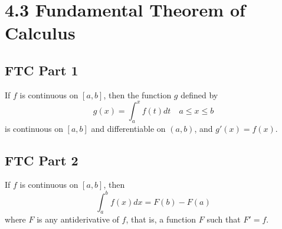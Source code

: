 %
%

\section*{4.3 Fundamental Theorem of Calculus}

\subsection*{FTC Part 1}

If \(f\) is continuous on \([a, b]\), then the function \(g\) defined by 
$$ g(x) = \int_a^x f(t)dt \quad a \leq x \leq b $$
is continuous on \([a, b]\) and differentiable on \((a, b)\), and \(g'(x)=f(x)\).

\subsection*{FTC Part 2}

If \(f\) is continuous on \([a, b]\), then 
$$ \int_a^b f(x)dx = F(b)- F(a) $$
where \(F\) is any antiderivative of \(f\), that is, a function \(F\) such that \(F'=f\).
